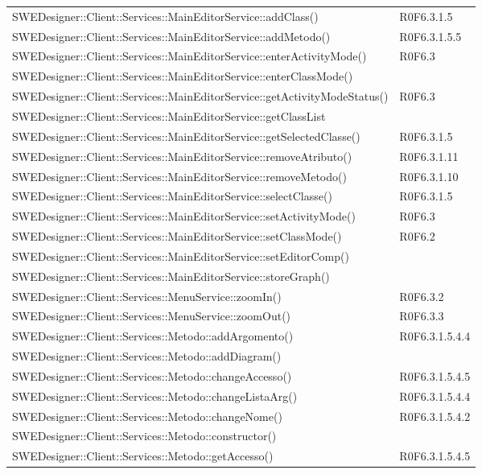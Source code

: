 \begin{center}
\begin{longtable}{p{13cm}!{\VRule[1pt]}p{2cm}}
SWEDesigner::Client::Services::MainEditorService::addClass() & R0F6.3.1.5\\
SWEDesigner::Client::Services::MainEditorService::addMetodo() & R0F6.3.1.5.5\\
SWEDesigner::Client::Services::MainEditorService::enterActivityMode() & R0F6.3\\
SWEDesigner::Client::Services::MainEditorService::enterClassMode() & \\
SWEDesigner::Client::Services::MainEditorService::getActivityModeStatus() & R0F6.3\\
SWEDesigner::Client::Services::MainEditorService::getClassList & \\
SWEDesigner::Client::Services::MainEditorService::getSelectedClasse() & R0F6.3.1.5\\
SWEDesigner::Client::Services::MainEditorService::removeAtributo() & R0F6.3.1.11\\
SWEDesigner::Client::Services::MainEditorService::removeMetodo() & R0F6.3.1.10\\
SWEDesigner::Client::Services::MainEditorService::selectClasse() & R0F6.3.1.5\\
SWEDesigner::Client::Services::MainEditorService::setActivityMode() & R0F6.3\\
SWEDesigner::Client::Services::MainEditorService::setClassMode() & R0F6.2\\
SWEDesigner::Client::Services::MainEditorService::setEditorComp() & \\
SWEDesigner::Client::Services::MainEditorService::storeGraph() & \\
SWEDesigner::Client::Services::MenuService::zoomIn() & R0F6.3.2\\
SWEDesigner::Client::Services::MenuService::zoomOut() & R0F6.3.3\\
SWEDesigner::Client::Services::Metodo::addArgomento() & R0F6.3.1.5.4.4\\
SWEDesigner::Client::Services::Metodo::addDiagram() & \\
SWEDesigner::Client::Services::Metodo::changeAccesso() & R0F6.3.1.5.4.5\\
SWEDesigner::Client::Services::Metodo::changeListaArg() & R0F6.3.1.5.4.4\\
SWEDesigner::Client::Services::Metodo::changeNome() & R0F6.3.1.5.4.2\\
SWEDesigner::Client::Services::Metodo::constructor() & \\
SWEDesigner::Client::Services::Metodo::getAccesso() & R0F6.3.1.5.4.5\\

\end{longtable}
\end{center}
